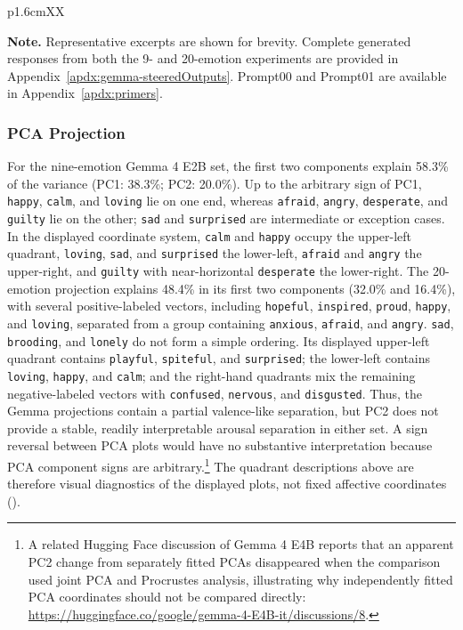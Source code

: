 \begin{table}[!htbp]
\begin{tabularx}{\linewidth}{p{1.6cm}XX}
    \bottomrule
    \end{tabularx}

    \vspace{0.3em}
    \begin{minipage}{\linewidth}
        \footnotesize
        \textbf{Note.} Representative excerpts are shown for brevity. Complete generated responses from both the 
        9- and 20-emotion experiments are provided in Appendix~\ref{apdx:gemma-steeredOutputs}. Prompt00 and Prompt01 are available in 
        Appendix~\ref{apdx:primers}.
    \end{minipage}
\end{table}

\subsubsection{PCA Projection}

For the nine-emotion Gemma 4 E2B set, the first two components explain 58.3\% of the variance (PC1: 38.3\%; PC2: 20.0\%). 
Up to the arbitrary sign of PC1, \texttt{happy}, \texttt{calm}, and \texttt{loving} lie on one end, whereas \texttt{afraid}, 
\texttt{angry}, \texttt{desperate}, and \texttt{guilty} lie on the other; \texttt{sad} and \texttt{surprised} are intermediate 
or exception cases. In the displayed coordinate system, \texttt{calm} and \texttt{happy} occupy the upper-left quadrant, \texttt{loving}, 
\texttt{sad}, and \texttt{surprised} the lower-left, \texttt{afraid} and \texttt{angry} the upper-right, and \texttt{guilty} with 
near-horizontal \texttt{desperate} the lower-right. The 20-emotion projection explains 48.4\% in its first two components (32.0\% and 16.4\%), with several 
positive-labeled vectors, including \texttt{hopeful}, \texttt{inspired}, \texttt{proud}, \texttt{happy}, and \texttt{loving},
separated from a group containing \texttt{anxious}, \texttt{afraid}, and \texttt{angry}. \texttt{sad}, \texttt{brooding}, and 
\texttt{lonely} do not form a simple ordering. Its displayed upper-left quadrant contains \texttt{playful}, \texttt{spiteful}, and 
\texttt{surprised}; the lower-left contains \texttt{loving}, \texttt{happy}, and \texttt{calm}; and the right-hand quadrants mix the 
remaining negative-labeled vectors with \texttt{confused}, \texttt{nervous}, and \texttt{disgusted}. Thus, the Gemma projections contain 
a partial valence-like separation, but PC2 
does not provide a stable, readily interpretable arousal separation in either set. A sign reversal between PCA plots would have 
no substantive interpretation because PCA component signs are arbitrary.\footnote{A related Hugging Face discussion of Gemma 4 E4B 
reports that an apparent PC2 change from separately fitted PCAs disappeared when the comparison used joint PCA and Procrustes analysis, 
illustrating why independently fitted PCA coordinates should not be compared directly: \url{https://huggingface.co/google/gemma-4-E4B-it/discussions/8}.} 
The quadrant descriptions above are therefore visual diagnostics of the displayed plots, not fixed affective coordinates 
().

